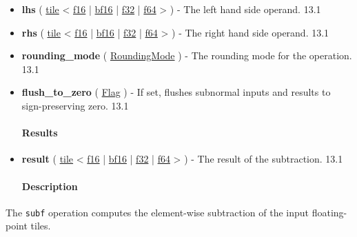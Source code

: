 \documentclass{article}
\begin{document}
\begin{itemize}
\item \textbf{lhs} ( \href{https://docs.nvidia.com/cuda/tile-ir/latest/sections/types.html#type-tile}{tile} < \href{https://docs.nvidia.com/cuda/tile-ir/latest/sections/types.html#subsection-element-types}{f16} | \href{https://docs.nvidia.com/cuda/tile-ir/latest/sections/types.html#subsection-element-types}{bf16} | \href{https://docs.nvidia.com/cuda/tile-ir/latest/sections/types.html#subsection-element-types}{f32} | \href{https://docs.nvidia.com/cuda/tile-ir/latest/sections/types.html#subsection-element-types}{f64} > ) - The left hand side operand. 13.1
\item \textbf{rhs} ( \href{https://docs.nvidia.com/cuda/tile-ir/latest/sections/types.html#type-tile}{tile} < \href{https://docs.nvidia.com/cuda/tile-ir/latest/sections/types.html#subsection-element-types}{f16} | \href{https://docs.nvidia.com/cuda/tile-ir/latest/sections/types.html#subsection-element-types}{bf16} | \href{https://docs.nvidia.com/cuda/tile-ir/latest/sections/types.html#subsection-element-types}{f32} | \href{https://docs.nvidia.com/cuda/tile-ir/latest/sections/types.html#subsection-element-types}{f64} > ) - The right hand side operand. 13.1
\item \textbf{rounding\_mode} ( \href{https://docs.nvidia.com/cuda/tile-ir/latest/sections/operations.html#op-attribute-cuda-tile-subf-roundingmode-attr}{RoundingMode} ) - The rounding mode for the operation. 13.1
\item \textbf{flush\_to\_zero} ( \href{https://docs.nvidia.com/cuda/tile-ir/latest/sections/operations.html#type-flag}{Flag} ) - If set, flushes subnormal inputs and results to sign-preserving zero. 13.1


\paragraph{Results}

\item \textbf{result} ( \href{https://docs.nvidia.com/cuda/tile-ir/latest/sections/types.html#type-tile}{tile} < \href{https://docs.nvidia.com/cuda/tile-ir/latest/sections/types.html#subsection-element-types}{f16} | \href{https://docs.nvidia.com/cuda/tile-ir/latest/sections/types.html#subsection-element-types}{bf16} | \href{https://docs.nvidia.com/cuda/tile-ir/latest/sections/types.html#subsection-element-types}{f32} | \href{https://docs.nvidia.com/cuda/tile-ir/latest/sections/types.html#subsection-element-types}{f64} > ) - The result of the subtraction. 13.1


\paragraph{Description}

\end{itemize}
The \texttt{subf} operation computes the element-wise subtraction of the input floating-point tiles.
\end{document}
